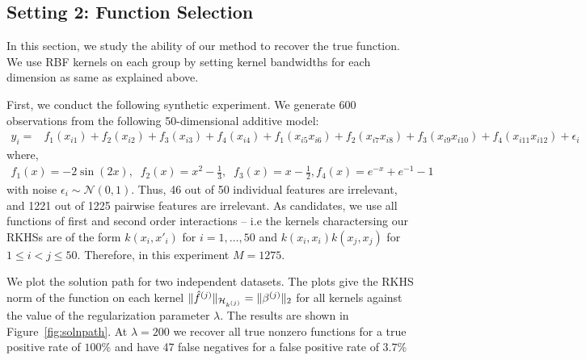 \insertFigRegFSel

% 

\subsection{Setting 2: Function Selection}

In this section, we study the ability of our method to recover the true function.
We use RBF kernels on each group by setting kernel bandwidths
for each dimension as same as explained above.

First, we conduct the following synthetic experiment.
We generate $600$ observations from the following
50-dimensional additive model:
\begingroup
\allowdisplaybreaks
\begin{align*}
	y_i =& f_1(x_{i1}) + f_2(x_{i2}) + f_3(x_{i3}) + f_4(x_{i4}) + 
f_1(x_{i5}x_{i6}) + f_2(x_{i7}x_{i8}) + 
f_3(x_{i9}x_{i10}) + f_4(x_{i11}x_{i12}) + \epsilon_i 
\end{align*}
\endgroup
where,
\begin{align*}
f_1(x) = -2\sin(2x), \;\; f_2(x) = x^2 - \frac{1}{3}, \;\;
f_3(x)= x-\frac{1}{2}, f_4(x) = e^{-x} + e^{-1} - 1
\end{align*}
with noise $\epsilon_i \sim \mathcal{N}(0,1)$.
Thus, 46 out of 50 individual features are irrelevant, and
1221 out of 1225 pairwise features are irrelevant.
As candidates, we use all functions of first and second order interactions --
i.e the kernels charactersing our RKHSs are of the form
$k(x_i, x'_i)$ for $i=1,\dots,50$ and $k(x_i,x_i)k(x_j,x_j)$ for
$1\leq i < j \leq 50$. Therefore, in this experiment $M = 1275$.

We plot the solution path for two independent datasets. The plots give the RKHS
norm of the function on each kernel $\|\hat{f}^{(j)}\|_{{{\mathcal{H}_{k^{(j)}}}}} = \|{\beta^{(j)}}\|_2$
for all kernels against the value of the regularization parameter $\lambda$.
The results are shown in Figure~\ref{fig:solnpath}. 
At $\lambda=200$ we recover all true nonzero functions for a true positive rate
of $100\%$ and have 47 false negatives for a false positive rate of $3.7\%$


